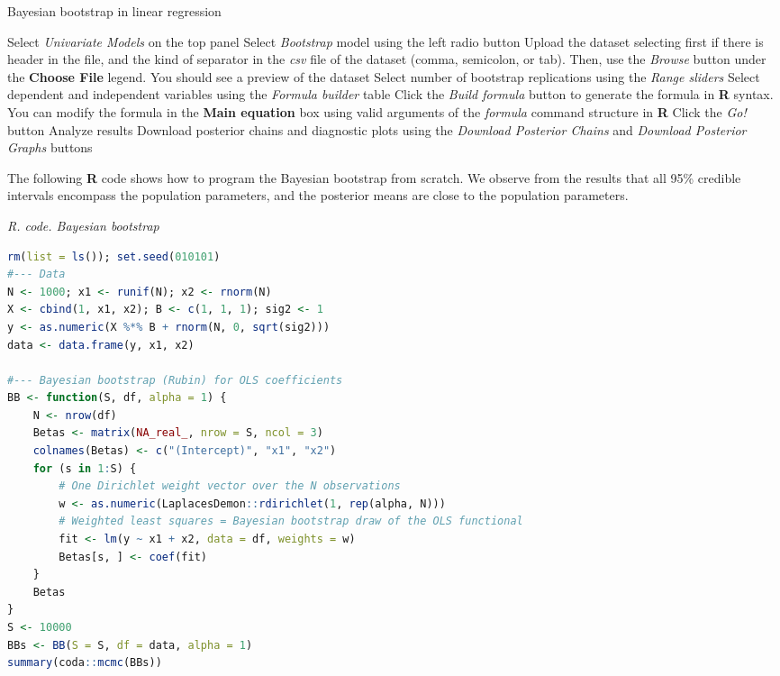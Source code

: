 \begin{algorithm}[h!]
	\caption{Bayesian bootstrap in linear regression}\label{alg:BayBootstrap}
	\begin{algorithmic}[1]  		 			
		\State Select \textit{Univariate Models} on the top panel
		\State Select \textit{Bootstrap} model using the left radio button
		\State Upload the dataset selecting first if there is header in the file, and the kind of separator in the \textit{csv} file of the dataset (comma, semicolon, or tab). Then, use the \textit{Browse} button under the \textbf{Choose File} legend. You should see a preview of the dataset
		\State Select number of bootstrap replications using the \textit{Range sliders}
		\State Select dependent and independent variables using the \textit{Formula builder} table
		\State Click the \textit{Build formula} button to generate the formula in \textbf{R} syntax. You can modify the formula in the \textbf{Main equation} box using valid arguments of the \textit{formula} command structure in \textbf{R}
		\State Click the \textit{Go!} button
		\State Analyze results
		\State Download posterior chains and diagnostic plots using the \textit{Download Posterior Chains} and \textit{Download Posterior Graphs} buttons
	\end{algorithmic} 
\end{algorithm}

The following \textbf{R} code shows how to program the Bayesian bootstrap from scratch. We observe from the results that all 95\% credible intervals encompass the population parameters, and the posterior means are close to the population parameters.

\begin{tcolorbox}[enhanced,width=4.67in,center upper,
	fontupper=\large\bfseries,drop shadow southwest,sharp corners]
	\textit{R. code. Bayesian bootstrap}
	\begin{VF}
		\begin{lstlisting}[language=R]
rm(list = ls()); set.seed(010101)
#--- Data
N <- 1000; x1 <- runif(N); x2 <- rnorm(N)
X <- cbind(1, x1, x2); B <- c(1, 1, 1); sig2 <- 1
y <- as.numeric(X %*% B + rnorm(N, 0, sqrt(sig2)))
data <- data.frame(y, x1, x2)

#--- Bayesian bootstrap (Rubin) for OLS coefficients
BB <- function(S, df, alpha = 1) {
	N <- nrow(df)
	Betas <- matrix(NA_real_, nrow = S, ncol = 3)
	colnames(Betas) <- c("(Intercept)", "x1", "x2")
	for (s in 1:S) {
		# One Dirichlet weight vector over the N observations
		w <- as.numeric(LaplacesDemon::rdirichlet(1, rep(alpha, N)))
		# Weighted least squares = Bayesian bootstrap draw of the OLS functional
		fit <- lm(y ~ x1 + x2, data = df, weights = w)
		Betas[s, ] <- coef(fit)
	}
	Betas
}
S <- 10000
BBs <- BB(S = S, df = data, alpha = 1)
summary(coda::mcmc(BBs))
\end{lstlisting}
	\end{VF}
\end{tcolorbox} 
 
